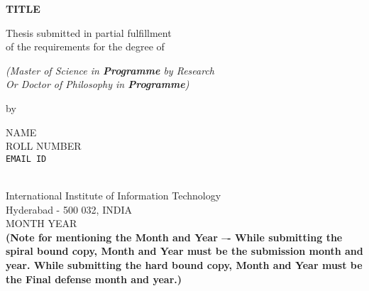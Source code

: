 \thispagestyle{empty}
\begin{center}
\vspace*{1.5cm}
{\Large \bf TITLE}

\vspace*{3.75cm}
{\large Thesis submitted in partial fulfillment\\}
{\large  of the requirements for the degree of \\}

\vspace*{1cm}
{\it {\large (Master of Science in \textbf{Programme} by Research} \\
{\large Or Doctor of Philosophy in \textbf{Programme})\\}}
    

\vspace*{1cm}
{\large by}

\vspace*{5mm}
{\large NAME\\}
{\large ROLL NUMBER\\
{\small \tt EMAIL ID}}


\vspace*{4.0cm}
{\\}
{\large International Institute of Information Technology\\}
{\large Hyderabad - 500 032, INDIA\\}
{\large MONTH YEAR\\}
\textbf{(Note for mentioning the Month and Year –- While submitting the spiral bound copy, Month and Year must be the submission month and year. While submitting the hard bound copy, Month and Year must be the Final defense month and year.)}
\end{center}